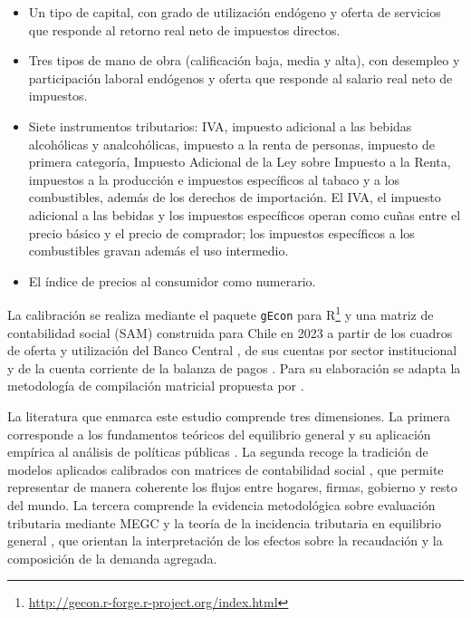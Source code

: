 \documentclass[11pt]{article}
\begin{document}
\begin{itemize}
  \item Un tipo de capital, con grado de utilización endógeno y oferta de servicios que responde al retorno real neto de impuestos directos.
  \item Tres tipos de mano de obra (calificación baja, media y alta), con desempleo y participación laboral endógenos y oferta que responde al salario real neto de impuestos.
  \item Siete instrumentos tributarios: IVA, impuesto adicional a las bebidas alcohólicas y analcohólicas, impuesto a la renta de personas, impuesto de primera categoría, Impuesto Adicional de la Ley sobre Impuesto a la Renta, impuestos a la producción e impuestos específicos al tabaco y a los combustibles, además de los derechos de importación. El IVA, el impuesto adicional a las bebidas y los impuestos específicos operan como cuñas entre el precio básico y el precio de comprador; los impuestos específicos a los combustibles gravan además el uso intermedio.
  \item El índice de precios al consumidor como numerario.
\end{itemize}

La calibración se realiza mediante el paquete \texttt{gEcon} para R\footnote{\url{http://gecon.r-forge.r-project.org/index.html}} y una matriz de contabilidad social (SAM) construida para Chile en 2023 a partir de los cuadros de oferta y utilización del Banco Central \cite{bcch_cou_2023}, de sus cuentas por sector institucional \cite{bcch_cnsi_2023} y de la cuenta corriente de la balanza de pagos \cite{bcch_bdp_2023}. Para su elaboración se adapta la metodología de compilación matricial propuesta por \cite{venegas_2013}.

La literatura que enmarca este estudio comprende tres dimensiones. La primera corresponde a los fundamentos teóricos del equilibrio general y su aplicación empírica al análisis de políticas públicas \cite{arrow_debreu_1954,shoven_whalley_1984,shoven_whalley_1992,dixon_jorgenson_2013}. La segunda recoge la tradición de modelos aplicados calibrados con matrices de contabilidad social \cite{pyatt_round_1985,dervis_demelo_robinson_1982}, que permite representar de manera coherente los flujos entre hogares, firmas, gobierno y resto del mundo. La tercera comprende la evidencia metodológica sobre evaluación tributaria mediante MEGC \cite{ballard_fullerton_shoven_whalley_1985} y la teoría de la incidencia tributaria en equilibrio general \cite{harberger_1962,fullerton_metcalf_2002}, que orientan la interpretación de los efectos sobre la recaudación y la composición de la demanda agregada.
\end{document}
